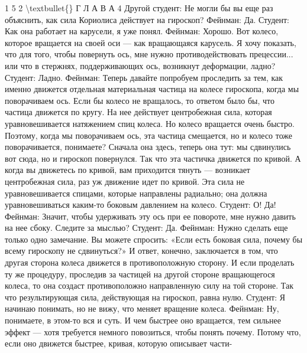 \documentclass[10pt,oneside]{article}
\begin{document}
1 5 2 \textbackslash{}textbullet\{\} Г Л А В А  4 Другой студент: Не могли бы вы еще раз объяснить, как сила Кориолиса действует на гироскоп? Фейнман: Да. Студент: Как она работает на карусели, я уже понял. Фейнман: Хорошо. Вот колесо, которое вращается на своей оси --- как вращающаяся карусель. Я хочу показать, что для того, чтобы повернуть ось, мне нужно противодействовать прецессии... или что в стержнях, поддерживающих ось, возникнут деформации, ладно? Студент: Ладно. Фейнман: Теперь давайте попробуем проследить за тем, как именно движется отдельная материальная частица на колесе гироскопа, когда мы поворачиваем ось. Если бы колесо не вращалось, то ответом было бы, что частица движется по кругу. На нее действует центробежная сила, которая уравновешивается натяжением спиц колеса. Но колесо вращается очень быстро. Поэтому, когда мы поворачиваем ось, эта частица смещается, но и колесо тоже поворачивается, понимаете? Сначала она здесь, теперь она тут: мы сдвинулись вот сюда, но и гироскоп повернулся. Так что эта частичка движется по кривой. А когда вы движетесь по кривой, вам приходится тянуть --- возникает центробежная сила, раз уж движение идет по кривой. Эта сила не уравновешивается спицами, которые направлены радиально; она должна уравновешиваться каким-то боковым давлением на колесо. Студент: О! Да! Фейнман: Значит, чтобы удерживать эту ось при ее повороте, мне нужно давить на нее сбоку. Следите за мыслью? Студент: Да. Фейнман: Нужно сделать еще только одно замечание. Вы можете спросить: «Если есть боковая сила, почему бы всему гироскопу не сдвинуться?» И ответ, конечно, заключается в том, что другая сторона колеса движется в противоположную сторону. И если проделать ту же процедуру, проследив за частицей на другой стороне вращающегося колеса, то она создаст противоположно направленную силу на той стороне. Так что результирующая сила, действующая на гироскоп, равна нулю. Студент: Я начинаю понимать, но не вижу, что меняет вращение колеса. Фейнман: Ну, понимаете, в этом-то вся и суть. И чем быстрее оно вращается, тем сильнее эффект --- хотя требуется немного повозиться, чтобы понять почему. Потому что, если оно движется быстрее, кривая, которую описывает части-\par
\end{document}
